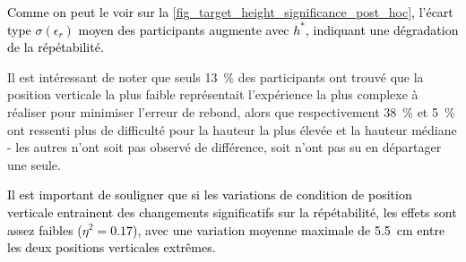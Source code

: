 \begin{figure}
	
\end{figure}

\textcolor{black}{Comme on peut le voir sur la \cref{fig_target_height_significance_post_hoc}, l'écart type $\sigma(\epsilon_r)$ moyen des participants augmente avec $h^*$, indiquant une dégradation de la répétabilité.} 

%
%
%

Il est intéressant de noter que seuls \SI{13}{\percent} des participants ont trouvé que la position verticale la plus faible représentait l'expérience la plus complexe à réaliser pour minimiser l'erreur de rebond, alors que respectivement \SI{38}{\percent} et \SI{5}{\percent} ont ressenti plus de difficulté pour la hauteur la plus élevée et la hauteur médiane - les autres n'ont soit pas observé de différence, soit n'ont pas su en départager une seule. 

\textcolor{black}{Il est important de souligner que si les variations de condition de position verticale entrainent des changements significatifs sur la répétabilité, les effets sont assez faibles ($\eta^{2}=0.17$), avec une variation moyenne maximale de \SI{5.5}{\centi\meter} entre les deux positions verticales extrêmes.}

